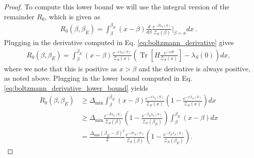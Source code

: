 \documentclass{article}
\newcommand{\parens}[1]{\left( #1 \right)}
\newcommand{\brackets}[1]{\left[ #1 \right]}
\DeclareMathOperator{\Tr}{Tr}
\newcommand{\trace}[1]{\Tr \brackets{ #1 }}
\newcommand{\partfun}{\mathcal{Z}}
\begin{document}
\begin{proof}
    To compute this lower bound we will use the integral version of the remainder $R_0$, which is given as 
    \begin{align}
        R_0(\beta, \beta_E) = \int_{\beta}^{\beta_E} (x - \beta) \frac{d}{d\beta} \frac{e^{-\beta \lambda_S(0)}}{\partfun_S(\beta)}\bigg|_{\beta = x} dx ~.
    \end{align}
    Plugging in the derivative computed in Eq. \eqref{eq:boltzmann_derivative} gives
    \begin{align}
        R_0(\beta, \beta_E) = \int_{\beta}^{\beta_E} (x - \beta) \frac{e^{-x \lambda_S(0)}}{\partfun_S(x)}\parens{\trace{H \frac{e^{- x H}}{\partfun_S(x)}} - \lambda_S(0)} dx,
    \end{align}
    where we note that this is positive as $x > \beta$ and the derivative is always positive, as noted above. Plugging in the lower bound computed in Eq. \eqref{eq:boltzmann_derivative_lower_bound} yields
    \begin{align}
        R_0(\beta, \beta_E) &\geq \Delta_{\min} \int_{\beta}^{\beta_E} (x - \beta) \frac{e^{-x \lambda_S(0)}}{\partfun_S(x)} \parens{1 - \frac{e^{-x \lambda_S(0)}}{\partfun_S(x)}} dx \\
        &\geq \Delta_{\min} \frac{e^{-\beta \lambda_S(0)}}{\partfun_S(\beta)} \parens{1 - \frac{e^{-\beta_E \lambda_S(0)}}{\partfun_S(\beta_E)}} \int_{\beta}^{\beta_E} (x - \beta) dx \\
        &= \frac{\Delta_{\min} (\beta_E - \beta)^2}{2} \frac{e^{-\beta \lambda_S(0)}}{\partfun_S(\beta)} \parens{1 - \frac{e^{-\beta_E \lambda_S(0)}}{\partfun_S(\beta_E)}}. \label{eq:boltzmann_lower_bound_penultimate}
    \end{align}


\end{proof}
\end{document}
